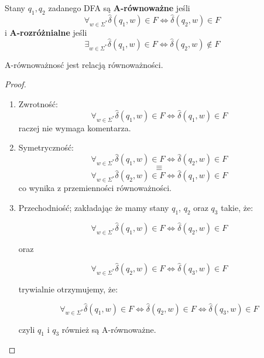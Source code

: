 \begin{definition}
    Stany \( q_1, q_2 \) zadanego DFA są \textbf{A-równoważne} jeśli
    \[
        \forall_{w \in \Sigma^*} \hat \delta(q_1, w) \in F \iff \hat \delta(q_2, w) \in F
    \]
    i \textbf{A-rozróżnialne} jeśli
    \[
        \exists_{w \in \Sigma^*} \hat \delta(q_1, w) \in F \iff \hat \delta(q_2, w) \notin F
    \]
\end{definition}


\begin{lemma}
    A-równoważnosć jest relacją równoważności.
\end{lemma}
\begin{proof}
    \begin{enumerate}
        \item Zwrotność: 
            \[
                \forall_{w \in \Sigma^*} \hat \delta(q_1, w) \in F \iff \hat \delta(q_1, w) \in F
            \]
            raczej nie wymaga komentarza.
        \item Symetryczność:
            \[ 
                \forall_{w \in \Sigma^*} \hat \delta(q_1, w) \in F \iff \hat \delta(q_2, w) \in F
            \]
            \[
                \equiv 
            \]
            \[
                \forall_{w \in \Sigma^*} \hat \delta(q_2, w) \in F \iff \hat \delta(q_1, w) \in F
            \]
            co wynika z przemienności równoważności.
        \item Przechodniość; zakładając że mamy stany \(q_1\), \(q_2\) oraz \(q_3\) takie, że:
        
        \[ 
             \forall_{w \in \Sigma^*} \hat \delta(q_1, w) \in F \iff \hat \delta(q_2, w) \in F
        \]
        
        oraz 
        
        \[ 
             \forall_{w \in \Sigma^*} \hat \delta(q_2, w) \in F \iff \hat \delta(q_3, w) \in F
        \]
        
        trywialnie otrzymujemy, że:
        
        \[ 
            \forall_{w \in \Sigma^*} \hat \delta(q_1, w) \in F \iff \hat \delta(q_2, w) \in F \iff \hat 
                         \delta(q_3, w) \in F
        \]
        
        czyli \(q_1\) i \(q_3\) również są A-równoważne. 
    \end{enumerate}
\end{proof}
